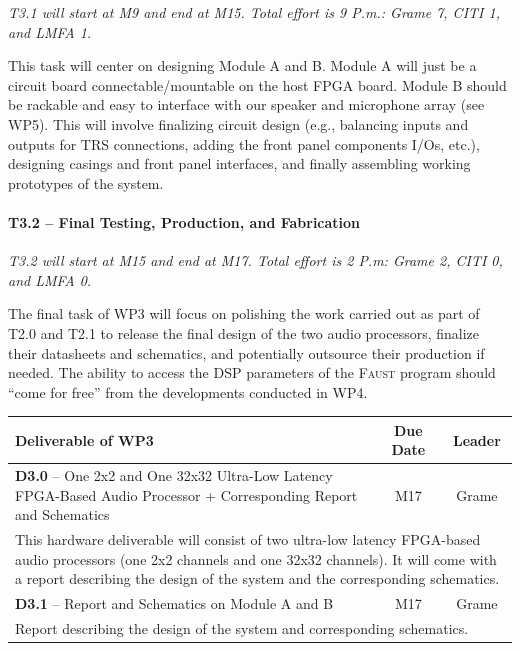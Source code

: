 \documentclass[a4paper,9pt]{extarticle}
\newcommand{\F}{\textsc{Faust}}
\begin{document}
\textit{T3.1 will start at M9 and end at M15. Total effort is 9 P.m.: Grame 7, CITI 1, and LMFA 1.}

This task will center on designing Module A and B. Module A will just be a circuit board connectable/mountable on the host FPGA board. Module B should be rackable and easy to interface with our speaker and microphone array (see WP5). This will involve finalizing circuit design (e.g., balancing inputs and outputs for TRS connections, adding the front panel components I/Os, etc.), designing casings and front panel interfaces, and finally assembling working prototypes of the system.

\paragraph{T3.2 -- Final Testing, Production, and Fabrication}

\textit{T3.2 will start at M15 and end at M17. Total effort is 2 P.m: Grame 2, CITI 0, and LMFA 0.}

The final task of WP3 will focus on polishing the work carried out as part of T2.0 and T2.1 to release the final design of the two audio processors, finalize their datasheets and schematics, and potentially outsource their production if needed. The ability to access the DSP parameters of the \F{} program should ``come for free'' from the developments conducted in WP4.

\begin{center}
\begin{tabular}{p{12cm} | c | c}
\textbf{Deliverable of WP3} & \textbf{Due Date} & \textbf{Leader}\\
\hline
\hline
\textbf{D3.0} -- One 2x2 and One 32x32 Ultra-Low Latency FPGA-Based Audio Processor + Corresponding Report and Schematics & M17 & Grame\\
\hline
\multicolumn{3}{p{16cm}}{This hardware deliverable will consist of two ultra-low latency FPGA-based audio processors (one 2x2 channels and one 32x32 channels). It will come with a report describing the design of the system and the corresponding schematics.}\\
\hline
\hline
\textbf{D3.1} -- Report and Schematics on Module A and B & M17 & Grame\\
\hline
\multicolumn{3}{p{16cm}}{Report describing the design of the system and corresponding schematics.}\\
\end{tabular}
\end{center}
\end{document}
